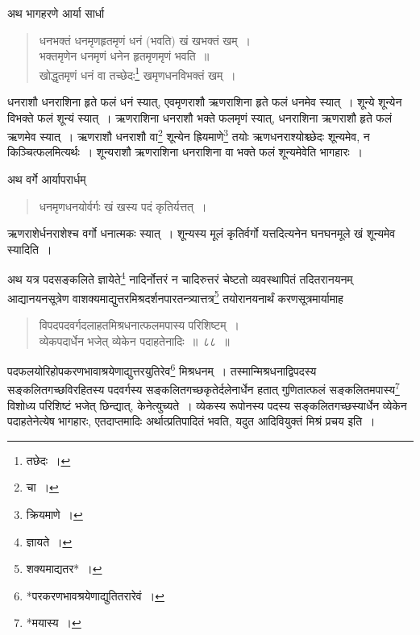 \documentclass[10pt, openany]{book}
\begin{document}
{{{{{{{{अथ भागहरणे आर्या सार्धा\textendash}

\begin{quote}
    
{\qt धनभक्तं धनमृणहृतमृणं धनं (भवति) खं खभक्तं खम्~।\\
 भक्तमृणेन धनमृणं धनेन हृतमृणमृणं भवति~॥ \\
 खोद्धृतमृणं धनं वा तच्छेदः\renewcommand{\thefootnote}{७}\footnote{तछेदः~।}  खमृणधनविभक्तं खम्~।}\end{quote}

{धनराशौ धनराशिना हृते फलं धनं स्यात्, एवमृणराशौ ऋणराशिना हृते फलं}
{धनमेव स्यात्~। शून्ये शून्येन विभक्ते फलं शून्यं स्यात्~। ऋणराशिना
धनराशौ भक्ते फलमृणं स्यात्, धनराशिना ऋणराशौ हृते फलं ऋणमेव स्यात्~। ऋणराशौ धनराशौ
वा\renewcommand{\thefootnote}{८}\footnote{चा~।}}
{शून्येन ह्रियमाणे\renewcommand{\thefootnote}{९}\footnote{क्रियमाणे~।}  तयोः ऋणधनराश्योश्च्छेदः शून्यमेव, न
किञ्चित्फलमित्यर्थः~। शून्यराशौ}
{ऋणराशिना धनराशिना वा भक्ते फलं शून्यमेवेति भागहारः~।} 

\newpage

 {अथ वर्गे आर्यापरार्धम्\textendash}

\begin{quote}
{\qt धनमृणधनयोर्वर्गः खं खस्य पदं कृतिर्यत्तत्~।}
\end{quote}

 {ऋणराशेर्धनराशेश्च वर्गो धनात्मकः स्यात्~। शून्यस्य मूलं कृतिर्वर्गो
यत्तदित्यनेन घनघनमूले खं शून्यमेव स्यादिति~।}
\vspace{3mm}

 {अथ यत्र पदसङ्कलिते ज्ञायेते\renewcommand{\thefootnote}{१}\footnote{ज्ञायते~।} नादिर्नोत्तरं न चादिरुत्तरं चेष्टतो
व्यवस्थापितं}
{तदितरानयनम् आद्यानयनसूत्रेण
वाशक्यमाद्युत्तरमिश्रदर्शनपारतन्त्र्यात्तत्र\renewcommand{\thefootnote}{२}\footnote{शक्यमाद्यतर*~।}  तयोरानयनार्थं करणसूत्रमार्यामाह\textendash}

 \label{88}
\begin{quote}
    
{\bs  विपदपदवर्गदलाहतमिश्रधनात्फलमपास्य परिशिष्टम्~।\\
 व्येकपदार्धेन भजेत् व्येकेन पदाहतेनादिः~॥~८८~॥}\end{quote}

 {पदफलयोरिहोपकरणभावाश्रयेणाद्युत्तरयुतिरेव\renewcommand{\thefootnote}{३}\footnote{*परकरणभावश्रयेणाद्युतितरारेवं~।}  मिश्रधनम्~।} {तस्मान्मिश्रधनाद्विपदस्य}
{सङ्कलितगच्छविरहितस्य पदवर्गस्य सङ्कलितगच्छकृतेर्दलेनार्धेन हतात्
गुणितात्फलं}
{सङ्कलितमपास्य\renewcommand{\thefootnote}{४}\footnote{*मयास्य~।}  विशोध्य परिशिष्टं भजेत् छिन्द्यात्, केनेत्युच्यते~। 
व्येकस्य रूपोनस्य पदस्य}
{सङ्कलितगच्छस्यार्धेन व्येकेन पदाहतेनेत्येष भागहारः, एतदाप्तमादिः
अर्थात्प्रतिपादितं}
{भवति, यदुत आदिवियुक्तं मिश्रं प्रचय इति~।}
\vspace{3mm}

}}}}}}}
\end{document}
